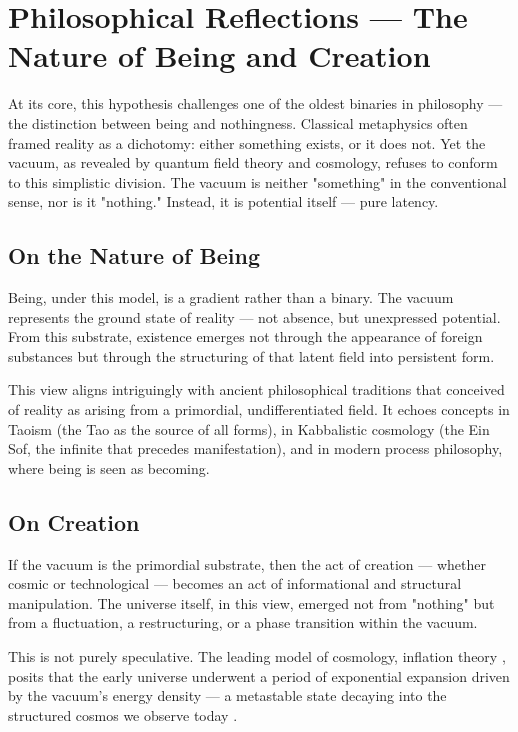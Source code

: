 \documentclass[12pt,a4paper]{article}
\begin{document}
\section{Philosophical Reflections — The Nature of Being and Creation}

At its core, this hypothesis challenges one of the oldest binaries in philosophy — the distinction between being and nothingness. Classical metaphysics often framed reality as a dichotomy: either something exists, or it does not. Yet the vacuum, as revealed by quantum field theory and cosmology, refuses to conform to this simplistic division. The vacuum is neither "something" in the conventional sense, nor is it "nothing." Instead, it is potential itself — pure latency.

\subsection{On the Nature of Being}

Being, under this model, is a gradient rather than a binary. The vacuum represents the ground state of reality — not absence, but unexpressed potential. From this substrate, existence emerges not through the appearance of foreign substances but through the structuring of that latent field into persistent form.

This view aligns intriguingly with ancient philosophical traditions that conceived of reality as arising from a primordial, undifferentiated field. It echoes concepts in Taoism (the Tao as the source of all forms), in Kabbalistic cosmology (the Ein Sof, the infinite that precedes manifestation), and in modern process philosophy, where being is seen as becoming.

\subsection{On Creation}

If the vacuum is the primordial substrate, then the act of creation — whether cosmic or technological — becomes an act of informational and structural manipulation. The universe itself, in this view, emerged not from "nothing" but from a fluctuation, a restructuring, or a phase transition within the vacuum.

This is not purely speculative. The leading model of cosmology, inflation theory \cite{guth1981}, posits that the early universe underwent a period of exponential expansion driven by the vacuum's energy density — a metastable state decaying into the structured cosmos we observe today \cite{guth2005}.
\end{document}
